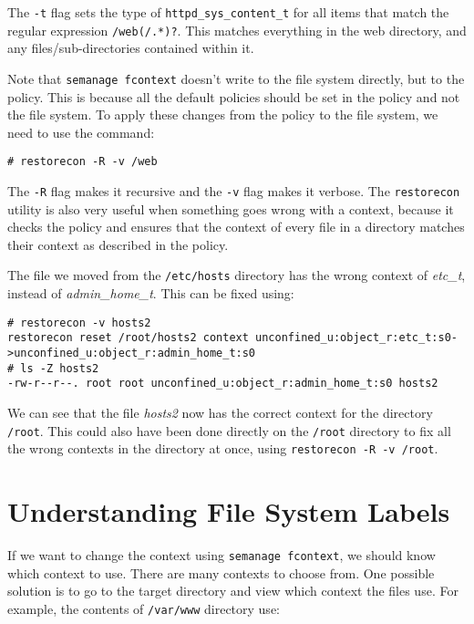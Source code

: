 \noindent
The \verb|-t| flag sets the type of \verb|httpd_sys_content_t| for all items that match the regular expression \verb|/web(/.*)?|. This matches everything in the web directory, and any files/sub-directories contained within it. 

Note that \verb|semanage fcontext| doesn't write to the file system directly, but to the policy. This is because all the default policies should be set in the policy and not the file system. To apply these changes from the policy to the file system, we need to use the command:

\vspace{-15pt}
\begin{verbatim}
# restorecon -R -v /web
\end{verbatim}
\vspace{-10pt}

\noindent
The \verb|-R| flag makes it recursive and the \verb|-v| flag makes it verbose. The \verb|restorecon| utility is also very useful when something goes wrong with a context, because it checks the policy and ensures that the context of every file in a directory matches their context as described in the policy. 

The file we moved from the \verb|/etc/hosts| directory has the wrong context of \textit{etc\_t}, instead of \textit{admin\_home\_t}. This can be fixed using:

\vspace{-15pt}
\begin{verbatim}
# restorecon -v hosts2 
restorecon reset /root/hosts2 context unconfined_u:object_r:etc_t:s0->unconfined_u:object_r:admin_home_t:s0
# ls -Z hosts2 
-rw-r--r--. root root unconfined_u:object_r:admin_home_t:s0 hosts2
\end{verbatim}
\vspace{-10pt}

\noindent
We can see that the file \textit{hosts2} now has the correct context for the directory \verb|/root|. This could also have been done directly on the \verb|/root| directory to fix all the wrong contexts in the directory at once, using \verb|restorecon -R -v /root|. 

\section{Understanding File System Labels}
If we want to change the context using \verb|semanage fcontext|, we should know which context to use. There are many contexts to choose from. One possible solution is to go to the target directory and view which context the files use. For example, the contents of \verb|/var/www| directory use:

